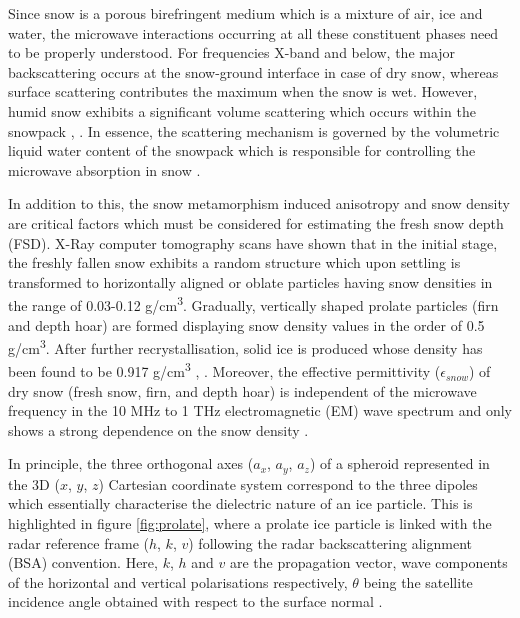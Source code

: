 \documentclass{article}
\begin{document}
Since snow is a porous birefringent medium which is a mixture of air, ice and water, the microwave interactions occurring at all these constituent phases need to be properly understood. For frequencies X-band and below, the major backscattering occurs at the snow-ground interface in case of dry snow, whereas surface scattering contributes the maximum when the snow is wet. However, humid snow exhibits a significant volume scattering which occurs within the snowpack \cite{Thakur2012}, \cite{Leinss2014}. In essence, the scattering mechanism is governed by the volumetric liquid water content of the snowpack which is responsible for controlling the microwave absorption in snow \cite{Leinss2014}.

In addition to this, the snow metamorphism induced anisotropy and snow density are critical factors which must be considered for estimating the fresh snow depth (FSD). X-Ray computer tomography scans have shown that in the initial stage, the freshly fallen snow exhibits a random structure which upon settling is transformed to horizontally aligned or oblate particles having snow densities in the range of 0.03-0.12 g/cm\textsuperscript{3}. Gradually, vertically shaped prolate particles (firn and depth hoar) are formed displaying snow density values in the order of 0.5 g/cm\textsuperscript{3}. After further recrystallisation, solid ice is produced whose density has been found to be 0.917 g/cm\textsuperscript{3} \cite{Leinss2014}, \cite{Riche2013}. Moreover, the effective permittivity ($\epsilon_{snow}$) of dry snow (fresh snow, firn, and depth hoar) is independent of the microwave frequency in the 10 MHz to 1 THz electromagnetic (EM) wave spectrum and only shows a strong dependence on the snow density \cite{Leinss2014}.

In principle, the three orthogonal axes ($a_x$, $a_y$, $a_z$) of a spheroid represented in the 3D ($x$, $y$, $z$) Cartesian coordinate system correspond to the three dipoles which essentially characterise the dielectric nature of an ice particle. This is highlighted in figure \ref{fig:prolate}, where a prolate ice particle is linked with the radar reference frame ($h$, $k$, $v$) following the radar backscattering alignment (BSA) convention. Here, $k$, $h$ and $v$ are the propagation vector, wave components of the horizontal and vertical polarisations respectively, $\theta$ being the satellite incidence angle obtained with respect to the surface normal \cite{Leinss2014}.
\end{document}
